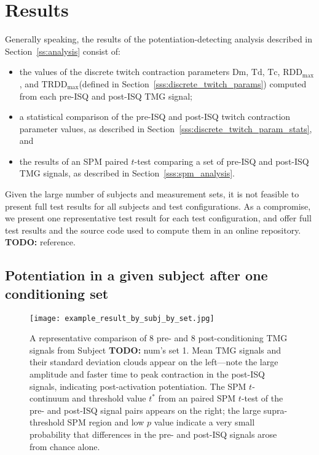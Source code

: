 \documentclass[utf8]{style/FrontiersinHarvard}
\newcommand{\TODO}[1]{{\textbf{TODO:} {\color{red} #1}}}
\newcommand{\Dm}{\ensuremath{\text{Dm}}\xspace}
\newcommand{\Td}{\ensuremath{\text{Td}}\xspace}
\newcommand{\Tc}{\ensuremath{\text{Tc}}\xspace}
\newcommand{\RDDMax}{\ensuremath{ \text{RDD}_{\text{max}}}\xspace}
\newcommand{\RDDMaxTime}{\ensuremath{ \text{TRDD}_{\text{max}}}\xspace}
\newcommand{\SPMArea}{\ensuremath{\text{SPMArea}}\xspace}
\begin{document}

\section{Results}

Generally speaking, the results of the potentiation-detecting analysis described in Section~\ref{ss:analysis} consist of:
\begin{itemize}

    \item the values of the discrete twitch contraction parameters \Dm, \Td, \Tc, \RDDMax, and \RDDMaxTime (defined in Section~\ref{sss:discrete_twitch_params}) computed from each pre-ISQ and post-ISQ TMG signal;

    \item a statistical comparison of the pre-ISQ and post-ISQ twitch contraction parameter values, as described in Section~\ref{sss:discrete_twitch_param_stats}, and

    \item the results of an SPM paired $ t $-test comparing a set of pre-ISQ and post-ISQ TMG signals, as described in Section~\ref{sss:spm_analysis}.

\end{itemize}
Given the large number of subjects and measurement sets, it is not feasible to present full test results for all subjects and test configurations.
As a compromise, we present one representative test result for each test configuration, and offer full test results and the source code used to compute them in an online repository.
\TODO{reference}.

\subsection{Potentiation in a given subject after one conditioning set}

\begin{figure}
	\centering
    \texttt{[image: example\_result\_by\_subj\_by\_set.jpg]}
    \caption{A representative comparison of 8 pre- and 8 post-conditioning TMG signals from Subject \TODO{num}'s set 1.
    Mean TMG signals and their standard deviation clouds appear on the left---note the large amplitude and faster time to peak contraction in the post-ISQ signals, indicating post-activation potentiation.
    The SPM $ t $-continuum and threshold value $ t^{*} $ from an paired SPM $ t $-test of the pre- and post-ISQ signal pairs appears on the right;
    the large supra-threshold SPM region and low $ p $ value indicate a very small probability that differences in the pre- and post-ISQ signals arose from chance alone.}
    \label{fig:spm_example_result_by_subj_by_set}
\end{figure}
\end{document}
